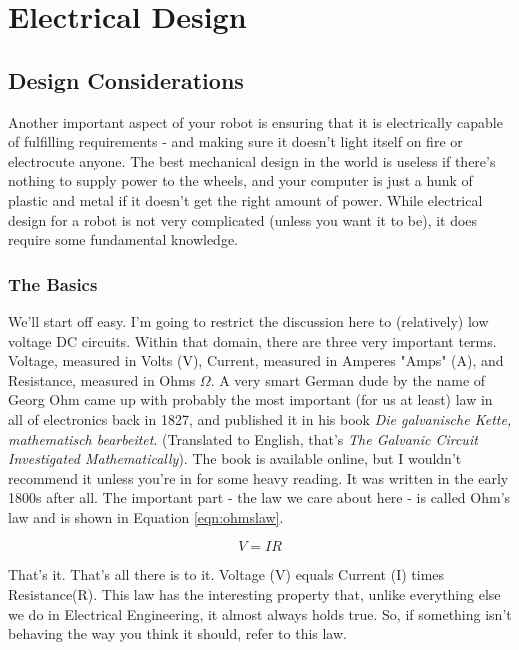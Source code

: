 
\chapter{Electrical Design}
\label{chap:ElecDes}

\section{Design Considerations}
Another important aspect of your robot is ensuring that it is electrically capable of fulfilling requirements - and making sure it doesn't light itself on fire or electrocute anyone. The best mechanical design in the world is useless if there's nothing to supply power to the wheels, and your computer is just a hunk of plastic and metal if it doesn't get the right amount of power. While electrical design for a robot is not very complicated (unless you want it to be), it does require some fundamental knowledge.

\subsection{The Basics}
We'll start off easy. I'm going to restrict the discussion here to (relatively) low voltage DC circuits. Within that domain, there are three very important terms. Voltage, measured in Volts (V), Current, measured in Amperes "Amps" (A), and Resistance, measured in Ohms $\Omega$. A very smart German dude by the name of Georg Ohm came up with probably the most important (for us at least) law in all of electronics back in 1827, and published it in his book \textit{Die galvanische Kette, mathematisch bearbeitet}. (Translated to English, that's \textit{The Galvanic Circuit Investigated Mathematically}). The book is available online, but I wouldn't recommend it unless you're in for some heavy reading. It was written in the early 1800s after all. The important part - the law we care about here - is called Ohm's law and is shown in Equation \ref{eqn:ohmslaw}.

\begin{equation}
V = IR
\label{eqn:ohmslaw}
\end{equation}

That's it. That's all there is to it. Voltage (V) equals Current (I) times Resistance(R). This law has the interesting property that, unlike everything else we do in Electrical Engineering, it almost always holds true. So, if something isn't behaving the way you think it should, refer to this law.

